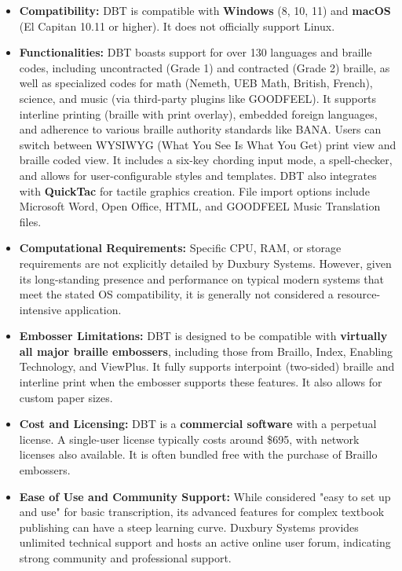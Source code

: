 \vspace{1em}
\begin{itemize}
\item \textbf{Compatibility:} DBT is compatible with \textbf{Windows} (8, 10, 11) and \textbf{macOS} (El Capitan 10.11 or higher)\footnotemark[1]. It does not officially support Linux.
\item \textbf{Functionalities:} DBT boasts support for over 130 languages and braille codes, including uncontracted (Grade 1) and contracted (Grade 2) braille, as well as specialized codes for math (Nemeth, UEB Math, British, French), science, and music (via third-party plugins like GOODFEEL). It supports interline printing (braille with print overlay), embedded foreign languages, and adherence to various braille authority standards like BANA. Users can switch between WYSIWYG (What You See Is What You Get) print view and braille coded view. It includes a six-key chording input mode, a spell-checker, and allows for user-configurable styles and templates. DBT also integrates with \textbf{QuickTac} for tactile graphics creation\footnotemark[2]. File import options include Microsoft Word, Open Office, HTML, and GOODFEEL Music Translation files.
\item \textbf{Computational Requirements:} Specific CPU, RAM, or storage requirements are not explicitly detailed by Duxbury Systems. However, given its long-standing presence and performance on typical modern systems that meet the stated OS compatibility, it is generally not considered a resource-intensive application.
\item \textbf{Embosser Limitations:} DBT is designed to be compatible with \textbf{virtually all major braille embossers}\footnotemark[1], including those from Braillo, Index, Enabling Technology, and ViewPlus. It fully supports interpoint (two-sided) braille and interline print when the embosser supports these features. It also allows for custom paper sizes.
\item \textbf{Cost and Licensing:} DBT is a \textbf{commercial software} with a perpetual license. A single-user license typically costs around \$695, with network licenses also available\footnotemark[3]. It is often bundled free with the purchase of Braillo embossers\footnotemark[4].
\item \textbf{Ease of Use and Community Support:} While considered "easy to set up and use" for basic transcription, its advanced features for complex textbook publishing can have a steep learning curve\footnotemark[2]. Duxbury Systems provides unlimited technical support and hosts an active online user forum, indicating strong community and professional support\footnotemark[2].
\end{itemize}
\vspace{1em}

